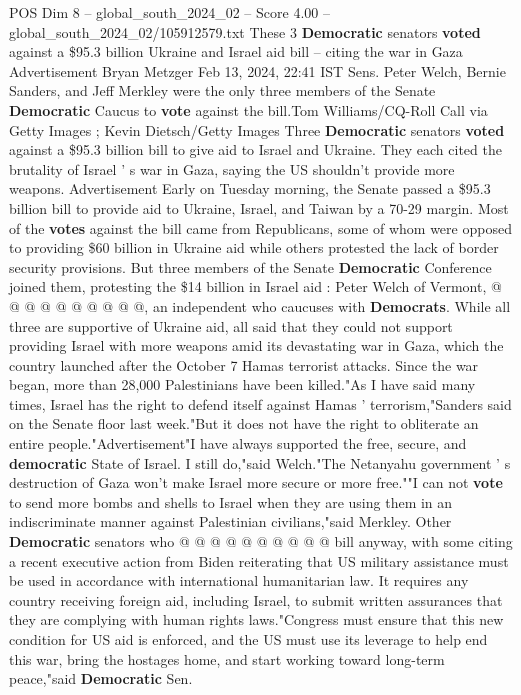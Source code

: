 \begin{textsample}{POS Dim 8 – global\_south\_2024\_02 – Score 4.00 – global\_south\_2024\_02/105912579.txt}  \label{ex:f8_pos_206}
These 3 \textbf{Democratic} senators \textbf{voted} against a \$95.3 billion Ukraine and Israel aid bill -- citing the war in Gaza Advertisement Bryan Metzger Feb 13, 2024, 22:41 IST Sens.
Peter Welch, Bernie Sanders, and Jeff Merkley were the only three members of the Senate \textbf{Democratic} Caucus to \textbf{vote} against the bill.Tom Williams/CQ-Roll Call via Getty Images ; Kevin Dietsch/Getty Images Three \textbf{Democratic} senators \textbf{voted} against a \$95.3 billion bill to give aid to Israel and Ukraine.
They each cited the brutality of Israel ' s war in Gaza, saying the US shouldn't provide more weapons.
Advertisement Early on Tuesday morning, the Senate passed a \$95.3 billion bill to provide aid to Ukraine, Israel, and Taiwan by a 70-29 margin.
Most of the \textbf{votes} against the bill came from Republicans, some of whom were opposed to providing \$60 billion in Ukraine aid while others protested the lack of border security provisions.
But three members of the Senate \textbf{Democratic} Conference joined them, protesting the \$14 billion in Israel aid : Peter Welch of Vermont, @ @ @ @ @ @ @ @ @ @, an independent who caucuses with \textbf{Democrats}.
While all three are supportive of Ukraine aid, all said that they could not support providing Israel with more weapons amid its devastating war in Gaza, which the country launched after the October 7 Hamas terrorist attacks.
Since the war began, more than 28,000 Palestinians have been killed."As I have said many times, Israel has the right to defend itself against Hamas ' terrorism,"Sanders said on the Senate floor last week."But it does not have the right to obliterate an entire people."Advertisement"I have always supported the free, secure, and \textbf{democratic} State of Israel.
I still do,"said Welch."The Netanyahu government ' s destruction of Gaza won't make Israel more secure or more free.""I can not \textbf{vote} to send more bombs and shells to Israel when they are using them in an indiscriminate manner against Palestinian civilians,"said Merkley.
Other \textbf{Democratic} senators who @ @ @ @ @ @ @ @ @ @ bill anyway, with some citing a recent executive action from Biden reiterating that US military assistance must be used in accordance with international humanitarian law.
It requires any country receiving foreign aid, including Israel, to submit written assurances that they are complying with human rights laws."Congress must ensure that this new condition for US aid is enforced, and the US must use its leverage to help end this war, bring the hostages home, and start working toward long-term peace,"said \textbf{Democratic} Sen.

\end{textsample}
